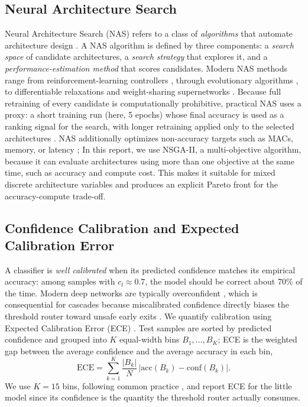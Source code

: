 \documentclass[conference]{IEEEtran}
\begin{document}
\subsection{Neural Architecture Search}
\label{sec:background:nas}

Neural Architecture Search (NAS) refers to a class of \emph{algorithms} that
automate architecture design \cite{elsken2019nassurvey}. A NAS algorithm is
defined by three components: a \emph{search space} of candidate architectures,
a \emph{search strategy} that explores it, and a \emph{performance-estimation
method} that scores candidates. Modern NAS methods range from
reinforcement-learning controllers \cite{zoph2017nasrl}, through evolutionary
algorithms \cite{real2019regevo,deb2002nsga2}, to differentiable relaxations
\cite{liu2019darts} and weight-sharing supernetworks \cite{pham2018enas}.
Because full retraining of every candidate is computationally prohibitive,
practical NAS uses a proxy: a short training run (here, 5 epochs) whose final
accuracy is used as a ranking signal for the search, with longer retraining
applied only to the selected architectures
\cite{real2019regevo,liu2019darts}. NAS additionally optimizes
non-accuracy targets such as MACs, memory, or latency
\cite{lu2019nsganet,chebykin2022encas,benmeziane2021hwnas}; In this report, we use NSGA-II, a multi-objective algorithm\cite{deb2002nsga2}, because it can evaluate architectures using more than one objective at the same time, such as accuracy and compute cost. This makes it suitable for mixed discrete architecture variables and produces an explicit Pareto front for the accuracy-compute trade-off.


\subsection{Confidence Calibration and Expected Calibration Error}
\label{sec:background:ece}

A classifier is \emph{well calibrated} when its predicted confidence matches
its empirical accuracy: among samples with $c_l \approx 0.7$, the model should
be correct about 70\% of the time. Modern deep networks are typically
overconfident \cite{guo2017calibration}, which is consequential for cascades
because miscalibrated confidence directly biases the threshold router toward
unsafe early exits \cite{li2021learningtocascade}. We quantify calibration
using Expected Calibration Error (ECE) \cite{naeini2015ece,guo2017calibration}.
Test samples are sorted by predicted confidence and grouped into $K$
equal-width bins $B_1,\dots,B_K$; ECE is the
weighted gap between the average confidence and the average accuracy in each
bin,
\begin{equation}
\mathrm{ECE} = \sum_{k=1}^{K} \frac{|B_k|}{N}\,
\bigl|\mathrm{acc}(B_k) - \mathrm{conf}(B_k)\bigr|.
\label{eq:ece}
\end{equation}
We use $K=15$ bins, following common practice \cite{guo2017calibration}, and
report ECE for the little model since its confidence is the quantity the
threshold router actually consumes.
\end{document}
